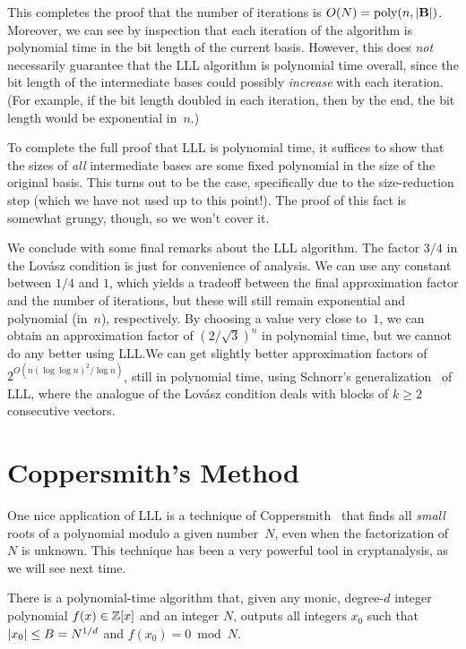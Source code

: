 \documentclass[11pt]{article}
\begin{document}
This completes the proof that the number of iterations is
$O(N) = \operatorname{poly}(n, \lvert\mathbf{B}\rvert)$. Moreover, we can see by inspection
that each iteration of the algorithm is polynomial time in the bit
length of the current basis. However, this does \emph{not} necessarily
guarantee that the LLL algorithm is polynomial time overall, since the
bit length of the intermediate bases could possibly \emph{increase}
with each iteration. (For example, if the bit length doubled in each
iteration, then by the end, the bit length would be exponential
in~$n$.)

To complete the full proof that LLL is polynomial time, it suffices to
show that the sizes of \emph{all} intermediate bases are some fixed
polynomial in the size of the original basis. This turns out to be the
case, specifically due to the size-reduction step (which we have not
used up to this point!). The proof of this fact is somewhat grungy,
though, so we won't cover it.

We conclude with some final remarks about the LLL algorithm. The
factor $3/4$ in the Lov{\'a}sz condition is just for convenience of
analysis. We can use any constant between $1/4$ and $1$, which yields
a tradeoff between the final approximation factor and the number of
iterations, but these will still remain exponential and polynomial
(in~$n$), respectively. By choosing a value very close to~$1$, we can
obtain an approximation factor of $(2/\sqrt{3})^{n}$ in polynomial
time, but we cannot do any better using LLL.\@ We can get slightly
better approximation factors of $2^{O(n(\log\log n)^2/\log n)}$,
still in polynomial time, using Schnorr's
generalization~\cite{DBLP:journals/tcs/Schnorr87} of LLL, where the
analogue of the Lov{\'a}sz condition deals with blocks of $k \geq 2$
consecutive vectors.

\section{Coppersmith's Method}
\label{sec:coppersmiths-method}

One nice application of LLL is a technique of
Coppersmith~\cite{DBLP:conf/eurocrypt/Coppersmith96} that finds all
\emph{small} roots of a polynomial modulo a given number~$N$, even
when the factorization of $N$ is unknown. This technique has been a
very powerful tool in cryptanalysis, as we will see next time.

\begin{theorem}
  \label{thm:coppersmith}
  There is a polynomial-time algorithm that, given any monic,
  degree-$d$ integer polynomial $f(x) \in \mathbb{Z}[x]$ and an integer $N$,
  outputs all integers $x_{0}$ such that
  $\lvert x_{0}\rvert \leq B = N^{1/d}$ and $f(x_{0}) = 0 \bmod N$.
\end{theorem}
\end{document}
